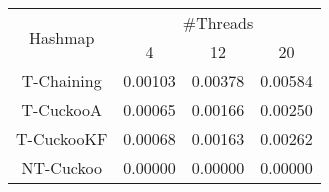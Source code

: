 \begin{tabular}{|c|c|c|c|}
\hline
\multirow{2}{*}{Hashmap} & \multicolumn{3}{c|}{\#Threads}\\\cline{2-4}& 4 & 12 & 20\\
\hline
\hline
T-Chaining & 0.00103 & 0.00378 & 0.00584\\
T-CuckooA & 0.00065 & 0.00166 & 0.00250\\
T-CuckooKF & 0.00068 & 0.00163 & 0.00262\\
NT-Cuckoo & 0.00000 & 0.00000 & 0.00000\\
\hline
\end{tabular}
